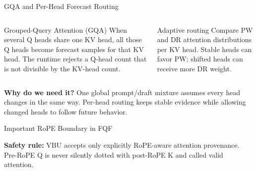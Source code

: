 \documentclass[aspectratio=169,10pt]{beamer}
\newcommand{\whylabel}{\textbf{Why do we need it?}}
\newcommand{\safetylabel}{\textbf{Safety rule:}}
\begin{document}
\begin{frame}{GQA and Per-Head Forecast Routing}
\small
\begin{columns}[T,onlytextwidth]
\begin{block}{Grouped-Query Attention (GQA)}
When several Q heads share one KV head, all those Q heads become forecast samples for that KV head.
The runtime rejects a Q-head count that is not divisible by the KV-head count.
\end{block}
\begin{block}{Adaptive routing}
Compare PW and DR attention distributions per KV head. Stable heads can favor PW; shifted heads can
receive more DR weight.
\end{block}
\end{columns}
\begin{alertblock}{\whylabel}
One global prompt/draft mixture assumes every head changes in the same way. Per-head routing keeps
stable evidence while allowing changed heads to follow future behavior.
\end{alertblock}
\end{frame}

\begin{frame}{Important RoPE Boundary in FQF}
\small
\begin{center}
\end{center}
\begin{alertblock}{\safetylabel}
VBU accepts only explicitly RoPE-aware attention provenance. Pre-RoPE Q is never silently dotted
with post-RoPE K and called valid attention.
\end{alertblock}
\end{frame}
\end{document}
